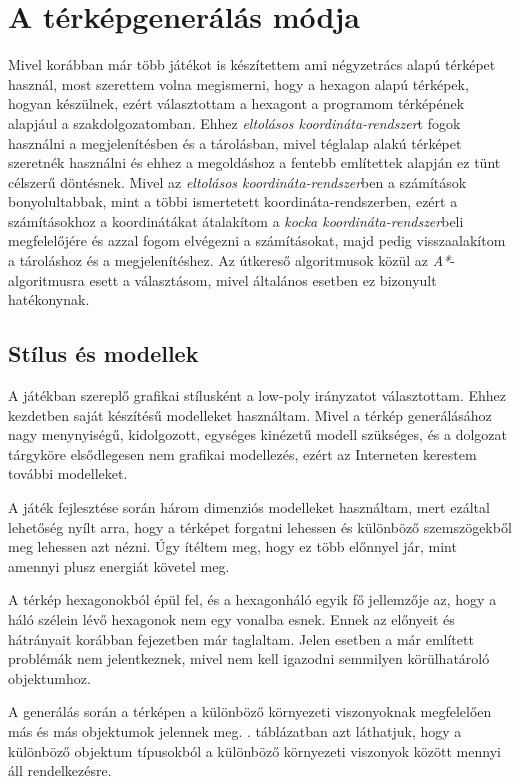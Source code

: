 \chapter{A térképgenerálás módja}
\label{chap:tervezes}

Mivel korábban már több játékot is készítettem ami négyzetrács alapú térképet használ, most szerettem volna megismerni, hogy a hexagon alapú térképek, hogyan készülnek, ezért választottam a hexagont a programom térképének alapjául a szakdolgozatomban. Ehhez \textit{eltolásos koordináta-rendszer}t fogok használni a megjelenítésben és a tárolásban, mivel téglalap alakú térképet szeretnék használni és ehhez a megoldáshoz a fentebb említettek alapján ez tünt célszerű döntésnek. Mivel az \textit{eltolásos koordináta-rendszer}ben a számítások bonyolultabbak, mint a többi ismertetett koordináta-rendszerben, ezért a számításokhoz a koordinátákat átalakítom a \textit{kocka koordináta-rendszer}beli megfelelőjére és azzal fogom elvégezni a számításokat, majd pedig visszaalakítom a tároláshoz és a megjelenítéshez. Az útkereső algoritmusok közül az \textit{A*}-algoritmusra esett a választásom, mivel általános esetben ez bizonyult hatékonynak.

\section{Stílus és modellek}

A játékban szereplő grafikai stílusként a low-poly irányzatot választottam. Ehhez kezdetben saját készítésű modelleket használtam. Mivel a térkép generálásához nagy meny\-nyi\-sé\-gű, kidolgozott, egységes kinézetű modell szükséges, és a dolgozat tárgyköre elsődlegesen nem grafikai modellezés, ezért az Interneten kerestem további modelleket.

A játék fejlesztése során három dimenziós modelleket használtam, mert ezáltal lehetőség nyílt arra, hogy a térképet forgatni lehessen és különböző szemszögekből meg lehessen azt nézni. Úgy ítéltem meg, hogy ez több előnnyel jár, mint amennyi plusz energiát követel meg.

A térkép hexagonokból épül fel, és a hexagonháló egyik fő jellemzője az, hogy a háló szélein lévő hexagonok nem egy vonalba esnek. Ennek az előnyeit és hátrányait korábban  fejezetben már taglaltam. Jelen esetben a már említett problémák nem jelentkeznek, mivel nem kell igazodni semmilyen körülhatároló objektumhoz.

A generálás során a térképen a különböző környezeti viszonyoknak megfelelően más és más objektumok jelennek meg. . táblázatban azt láthatjuk, hogy a különböző objektum típusokból a különböző környezeti viszonyok között mennyi áll rendelkezésre.

